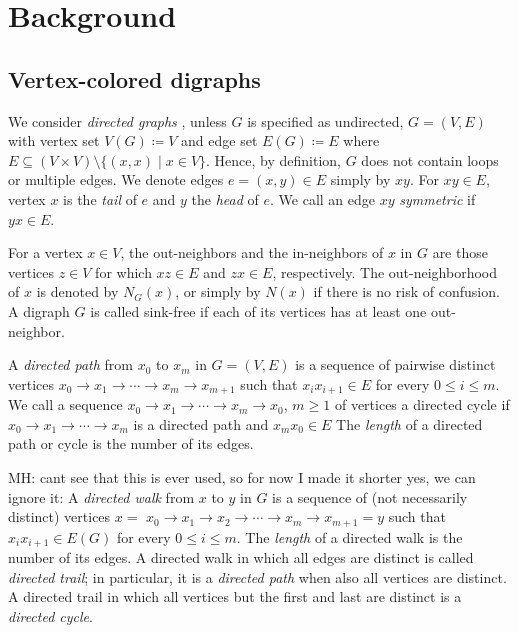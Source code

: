\documentclass[final,3p,times]{elsarticle}
\newcommand{\TODO}[1]{\begingroup\color{red}#1\endgroup}
\newcommand{\ak}[1]{\begingroup\color{orange}#1\endgroup}
\newcommand{\OLD}[1]{\begingroup\tiny\color{gray}#1\endgroup}
\newcommand{\mh}[1]{\begingroup\color{blue}#1\endgroup}
\begin{document}
\section{Background}
\label{sec:background}
\subsection{Vertex-colored digraphs}


We consider \emph{directed graphs} \ak{, unless $G$ is specified as undirected,} $G=(V,E)$ with vertex set $V(G)\coloneqq V$ and edge set $E(G)\coloneqq E$
where $E\subseteq (V\times V)\setminus \{(x,x)\mid x\in V\}$. Hence, by definition, $G$ does not contain 
loops or multiple edges. We denote edges $e=(x,y)\in E$ simply by $xy$. For $xy\in E$, vertex $x$ is the \emph{tail} of $e$
and $y$ the \emph{head} of $e$. We call an edge $xy$ \emph{symmetric} if $yx\in E$. 

For a vertex $x\in V$, the out-neighbors and the in-neighbors of $x$ in $G$
are those vertices $z\in V$ for which $xz\in E$ and $zx\in E$, respectively. The
out-neighborhood of $x$ is denoted by $N_G(x)$, or 
simply by $N(x)$ if there is no risk of confusion. A digraph $G$ is called sink-free if each
of its vertices has at least one out-neighbor.

A \emph{directed path} from $x_0$ to $x_m$ in $G = (V,E)$ is a sequence of 
pairwise distinct vertices $x_0\rightarrow x_1 \rightarrow \cdots\rightarrow x_m
\rightarrow x_{m+1}$ such that $x_ix_{i+1}\in E$ for every
$0\le i \le m$. 
We call a sequence $x_0\rightarrow x_1 \rightarrow \cdots\rightarrow x_m\rightarrow  x_0$, $m\geq 1$
of vertices a directed cycle if $x_0\rightarrow x_1 \rightarrow \cdots\rightarrow x_m$
is a directed path and $x_mx_0\in E$
The \emph{length} of a directed path or cycle is the number of its edges.

\OLD{\TODO{MH: cant see that this is ever used, so for now I made it shorter \ak{yes, we can ignore it}:}
A \emph{directed walk} from $x$ to $y$ in $G$ is a sequence of \mh{(not necessarily
distinct)} vertices
\OLD{$x=$} $x_0\rightarrow x_1 \rightarrow x_2 \rightarrow \cdots\rightarrow x_m
\rightarrow x_{m+1}$\OLD{$=y $} such that $x_ix_{i+1}\in E(G)$ for every
$0\le i \le m$. The \emph{length} of a directed walk is the number of its edges.
A directed walk in which all edges are distinct is called \emph{directed trail};
in particular, it is a \emph{directed path} when also all vertices are distinct.
A directed trail in which all vertices but the first and last are distinct is a
\emph{directed cycle}. 
}
\end{document}
